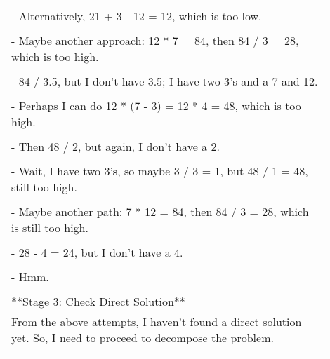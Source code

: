 \begin{table*}[ht]
\begin{tabular}{p{0.9\linewidth}}
\\
- Alternatively, 21 + 3 - 12 = 12, which is too low.\\
\\
- Maybe another approach: 12 * 7 = 84, then 84 / 3 = 28, which is too high.\\
\\
- 84 / 3.5, but I don't have 3.5; I have two 3's and a 7 and 12.\\
\\
- Perhaps I can do 12 * (7 - 3) = 12 * 4 = 48, which is too high.\\
\\
- Then 48 / 2, but again, I don't have a 2.\\
\\
- Wait, I have two 3's, so maybe 3 / 3 = 1, but 48 / 1 = 48, still too high.\\
\\
- Maybe another path: 7 * 12 = 84, then 84 / 3 = 28, which is still too high.\\
\\
- 28 - 4 = 24, but I don't have a 4.\\
\\
- Hmm.\\
\\
**Stage 3: Check Direct Solution**
\\
From the above attempts, I haven't found a direct solution yet. So, I need to proceed to decompose the problem.\\
\\ \bottomrule
\end{tabular}
\label{tab:qwq_LRM_game24_seal1}
\end{table*}

